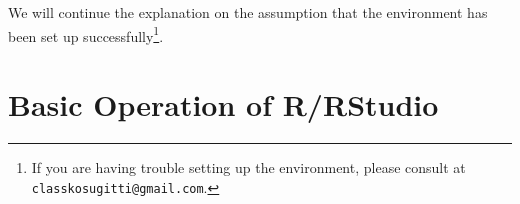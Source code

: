 \documentclass{ltjsbook}
\begin{document}
We will continue the explanation on the assumption that the environment has been set up successfully\footnote{If you are having trouble setting up the environment, please consult at \texttt{classkosugitti@gmail.com}.}.

\section{Basic Operation of R/RStudio}
\end{document}
